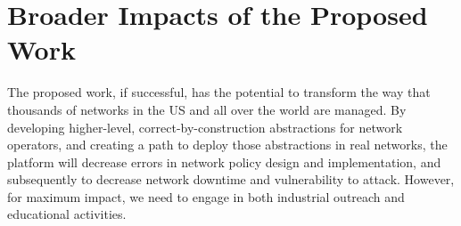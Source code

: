 




\section{Broader Impacts of the Proposed Work}
\label{sec:impact}

The proposed work, if successful, has the potential to transform the way
that thousands of networks in the US and all over the world are managed.
By developing higher-level, correct-by-construction abstractions for
network operators, and creating a path to deploy those abstractions
in real networks, the \Name platform will decrease
errors in network policy design and implementation, and subsequently
to decrease network downtime and vulnerability to attack.  However,
for maximum impact, we need to engage in both industrial outreach and
educational activities.

